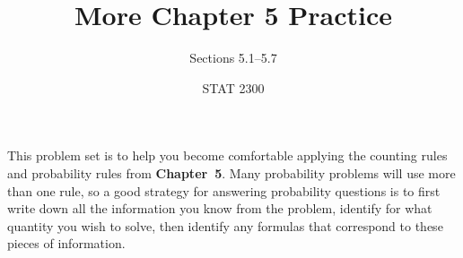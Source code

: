 \documentclass[noanswers]{exam}
\title{More Chapter 5 Practice}
\author{Sections 5.1--5.7}
\date{STAT 2300}
\begin{document}
%

\noindent This problem set is to help you become comfortable applying the counting rules and probability rules from \textbf{Chapter~5}. Many probability problems will use more than one rule, so a good strategy for answering probability questions is to first write down all the information you know from the problem, identify for what quantity you wish to solve, then identify any formulas that correspond to these pieces of information.



\vspace{3mm}
\end{document}
